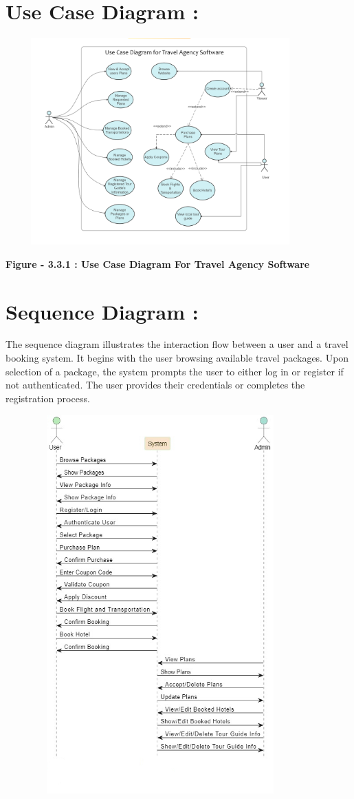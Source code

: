 \documentclass{scrreprt}
\begin{document}
\section *{ Use Case Diagram : }
{\includegraphics[width=450px, height=300px]{uml.png}}

\begin{center}
    \parbox{0.8\textwidth}{ 
        \centering
        \textbf{Figure - 3.3.1 : Use Case Diagram For Travel Agency Software}
    }
\end{center}

\section{ Sequence Diagram : }

The sequence diagram illustrates the interaction flow between a user and a travel booking system. It begins with the user browsing available travel packages. Upon selection of a package, the system prompts the user to either log in or register if not authenticated. The user provides their credentials or completes the registration process. 

{\includegraphics[width=450px, height=550px]{sqd.jpg}}
\end{document}

